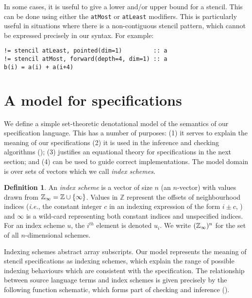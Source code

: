 \documentclass[10pt,preprint,numbers]{sigplanconf}
\newcounter{block}
\theoremstyle{definition}
\newtheorem{definition}[block]{Definition}
\newcommand{\ie}{\emph{i.e.}}
\newcommand{\term}[1]{\texttt{#1}}
\begin{document}
In some cases, it is useful to give a lower and/or upper bound for a
stencil. This can be done using either the \term{atMost} or
\term{atLeast} modifiers. This is particularly useful in situations
where there is a non-contiguous stencil pattern, which cannot be expressed
precisely in our syntax. For example:
%
\begin{verbatim}
!= stencil atLeast, pointed(dim=1)         :: a
!= stencil atMost, forward(depth=4, dim=1) :: a
b(i) = a(i) + a(i+4)
\end{verbatim}

\section{A model for specifications}
\label{sec:semantics}

We define a simple set-theoretic denotational model of the semantics
of our specification language. This has a number of purposes:
(1) it serves to explain the meaning of our specifications
(2) it is used in the inference and checking algorithms
(); (3) justifies an equational theory for
specifications in the next section; and (4) can be used to guide
correct implementations. The model domain is over sets of vectors
which we call \emph{index schemes}.

\begin{definition}
  An \emph{index scheme} is a vector of size $n$ (an $n$-vector) with
  values drawn from $\mathbb{Z}_\infty = \mathbb{Z} \cup \{\infty\}$.  Values
  in $\mathbb{Z}$ represent the offsets of neighbourhood indices
  (\ie{}, the constant integer $c$ in an indexing expression of the
  form $i \pm c$, ) and $\infty$ is a wild-card
  representing both constant indices and unspecified indices.
  For an index scheme $u$, the $i^{th}$ element is denoted $u_i$. We
  write $(\mathbb{Z}_\infty)^n$ for the set of all $n$-dimensional schemes.
\end{definition}

Indexing schemes abstract array subscripts.
Our model represents the meaning of stencil specifications
as indexing schemes, which explain the range of possible
indexing behaviours which are consistent with the specification.
The relationship between source language
terms and index schemes
 is given precisely by the following function \textsf{schematic},
 which forms part of checking and inference ().
\end{document}
